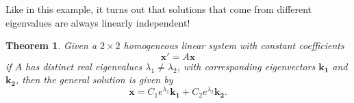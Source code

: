 \documentclass[12pt]{amsart}
\numberwithin{equation}{section}
\theoremstyle{plain} %
\newtheorem{thm}[equation]{Theorem}
\newcommand{\rsa}{\rightsquigarrow}
\theoremstyle{definition}
\newtheorem{ex}[equation]{Example}
\theoremstyle{remark}
\begin{document}
Like in this example, it turns out that solutions that come from different eigenvalues are always linearly independent!

\begin{thm} Given a $2\times 2$ homogeneous linear system with constant coefficients
\[ \mathbf{x}'=A\mathbf{x}\]
if $A$ has distinct real eigenvalues $\lambda_1\neq \lambda_2$, with corresponding eigenvectors $\mathbf{k_1}$ and $\mathbf{k_2}$, then the general solution is given by
\[ \mathbf{x} = C_1 e^{\lambda_1} \mathbf{k_1} + C_2 e^{\lambda_2} \mathbf{k_2}.\]
\end{thm}

\end{document}
